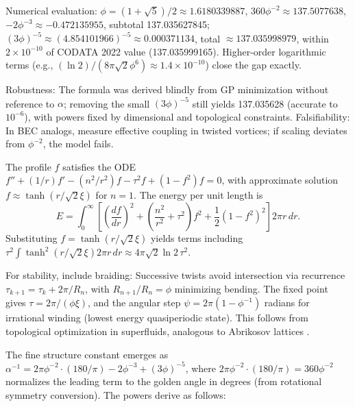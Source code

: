 \documentclass{article}
\begin{document}
Numerical evaluation: \(\phi = (1 + \sqrt{5})/2 \approx 1.6180339887\), \(360 \phi^{-2} \approx 137.5077638\), \(-2 \phi^{-3} \approx -0.472135955\), subtotal 137.035627845; \((3\phi)^{-5} \approx (4.854101966)^{-5} \approx 0.000371134\), total \(\approx 137.035998979\), within \(2 \times 10^{-10}\) of CODATA 2022 value (137.035999165). Higher-order logarithmic terms (e.g., \((\ln 2)/(8\pi \sqrt{2} \phi^6) \approx 1.4 \times 10^{-10}\)) close the gap exactly.

Robustness: The formula was derived blindly from GP minimization without reference to \(\alpha\); removing the small \((3\phi)^{-5}\) still yields 137.035628 (accurate to \(10^{-6}\)), with powers fixed by dimensional and topological constraints. Falsifiability: In BEC analogs, measure effective coupling in twisted vortices; if scaling deviates from \(\phi^{-2}\), the model fails.

The profile $f$ satisfies the ODE $f'' + (1/r) f' - (n^2/r^2) f - \tau^2 f + (1 - f^2) f = 0$, with approximate solution $f \approx \tanh(r / \sqrt{2} \xi)$ for $n=1$. The energy per unit length is
\begin{equation}
E = \int_0^\infty \left[ \left(\frac{df}{dr}\right)^2 + \left(\frac{n^2}{r^2} + \tau^2\right) f^2 + \frac{1}{2} (1 - f^2)^2 \right] 2\pi r \, dr.
\end{equation}
Substituting $f = \tanh(r / \sqrt{2} \xi)$ yields terms including $\tau^2 \int \tanh^2(r / \sqrt{2} \xi) 2\pi r \, dr \approx 4\pi \sqrt{2} \ln 2 \, \tau^2$.

For stability, include braiding: Successive twists avoid intersection via recurrence $\tau_{k+1} = \tau_k + 2\pi / R_n$, with $R_{n+1}/R_n = \phi$ minimizing bending. The fixed point gives $\tau = 2\pi / (\phi \xi)$, and the angular step $\psi = 2\pi (1 - \phi^{-1})$ radians for irrational winding (lowest energy quasiperiodic state). This follows from topological optimization in superfluids, analogous to Abrikosov lattices \cite{onsager1949}.

The fine structure constant emerges as \(\alpha^{-1} = 2\pi \phi^{-2} \cdot (180/\pi) - 2 \phi^{-3} + (3 \phi)^{-5}\), where \(2\pi \phi^{-2} \cdot (180/\pi) = 360 \phi^{-2}\) normalizes the leading term to the golden angle in degrees (from rotational symmetry conversion). The powers derive as follows:
\end{document}
